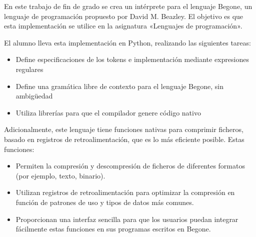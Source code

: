 En este trabajo de fin de grado se crea un intérprete para el lenguaje Begone, un lenguaje de programación propuesto por David M. Beazley. El objetivo es que esta implementación se utilice en la asignatura «Lenguajes de programación».

El alumno lleva esta implementación en Python, realizando las siguientes tareas:

\begin{itemize}
  \item Define especificaciones de los tokens e implementación mediante expresiones regulares
  \item Define una gramática libre de contexto para el lenguaje Begone, sin ambigüedad
  \item Utiliza librerías para que el compilador genere código nativo
\end{itemize}

Adicionalmente, este lenguaje tiene funciones nativas para comprimir ficheros, basado en registros de retroalimentación, que es lo más eficiente posible. Estas funciones:

\begin{itemize}
  \item Permiten la compresión y descompresión de ficheros de diferentes formatos (por ejemplo, texto, binario).
  \item Utilizan registros de retroalimentación para optimizar la compresión en función de patrones de uso y tipos de datos más comunes.
  \item Proporcionan una interfaz sencilla para que los usuarios puedan integrar fácilmente estas funciones en sus programas escritos en Begone.
\end{itemize}
